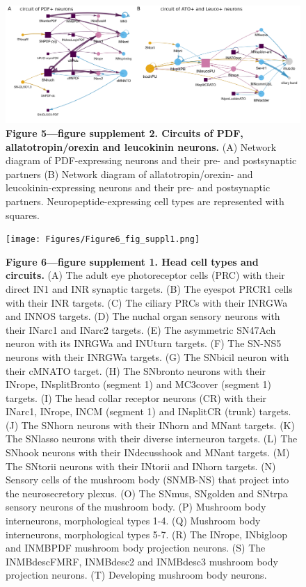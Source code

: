 \documentclass[
  11pt,
]{article}
\begin{document}
\begin{figure}[H]

{\centering \includegraphics[width=1\textwidth,height=\textheight]{Figures/Figure5_fig_suppl2.png}

}

\caption{\textbf{Figure 5---figure supplement 2. Circuits of PDF,
allatotropin/orexin and leucokinin neurons. } (A) Network diagram of
PDF-expressing neurons and their pre- and postsynaptic partners (B)
Network diagram of allatotropin/orexin- and leucokinin-expressing
neurons and their pre- and postsynaptic partners.
Neuropeptide-expressing cell types are represented with squares.}

\end{figure}%

\begin{figure}[H]

{\centering \texttt{[image: Figures/Figure6\_fig\_suppl1.png]}

}

\caption{\textbf{Figure 6---figure supplement 1. Head cell types and
circuits. } (A) The adult eye photoreceptor cells (PRC) with their
direct IN1 and INR synaptic targets. (B) The eyespot PRCR1 cells with
their INR targets. (C) The ciliary PRCs with their INRGWa and INNOS
targets. (D) The nuchal organ sensory neurons with their INarc1 and
INarc2 targets. (E) The asymmetric SN47Ach neuron with its INRGWa and
INUturn targets. (F) The SN-NS5 neurons with their INRGWa targets. (G)
The SNbicil neuron with their cMNATO target. (H) The SNbronto neurons
with their INrope, INsplitBronto (segment 1) and MC3cover (segment 1)
targets. (I) The head collar receptor neurons (CR) with their INarc1,
INrope, INCM (segment 1) and INsplitCR (trunk) targets. (J) The SNhorn
neurons with their INhorn and MNant targets. (K) The SNlasso neurons
with their diverse interneuron targets. (L) The SNhook neurons with
their INdecusshook and MNant targets. (M) The SNtorii neurons with their
INtorii and INhorn targets. (N) Sensory cells of the mushroom body
(SNMB-NS) that project into the neurosecretory plexus. (O) The SNmus,
SNgolden and SNtrpa sensory neurons of the mushroom body. (P) Mushroom
body interneurons, morphological types 1-4. (Q) Mushroom body
interneurons, morphological types 5-7. (R) The INrope, INbigloop and
INMBPDF mushroom body projection neurons. (S) The INMBdescFMRF,
INMBdesc2 and INMBdesc3 mushroom body projection neurons. (T) Developing
mushroom body neurons.}

\end{figure}%
\end{document}
